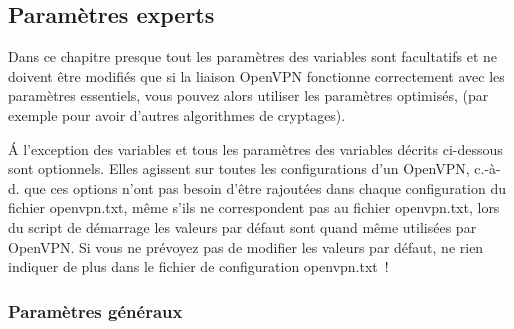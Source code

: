 \subsection{Paramètres experts}

Dans ce chapitre presque tout les paramètres des variables sont facultatifs et ne
doivent être modifiés que si la liaison OpenVPN fonctionne correctement avec les
paramètres essentiels, vous pouvez alors utiliser les paramètres optimisés, (par
exemple pour avoir d'autres algorithmes de cryptages).

Á l'exception des variables  et 
tous les paramètres des variables  décrits ci-dessous
sont optionnels. Elles agissent sur toutes les configurations d'un OpenVPN, c.-à-d.
que ces options n'ont pas besoin d'être rajoutées dans chaque configuration
du fichier openvpn.txt, même s'ils ne correspondent pas au fichier openvpn.txt,
lors du script de démarrage les valeurs par défaut sont quand même utilisées
par OpenVPN. Si vous ne prévoyez pas de modifier les valeurs par défaut, ne rien
indiquer de plus dans le fichier de configuration openvpn.txt~!

\subsubsection{Paramètres généraux}

